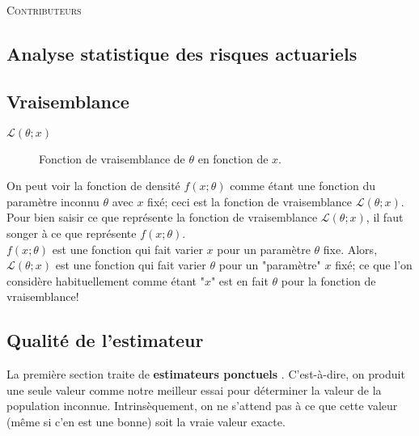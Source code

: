 \documentclass[10pt, french]{article}
\begin{document}
\begin{center}
	\textsc{\Large Contributeurs}\\[0.5cm] 
\end{center}


\newpage

\raggedcolumns
\begin{multicols*}{2}

\section*{Analyse statistique des risques actuariels}

\subsection*{Vraisemblance}

\begin{distributions}[Notation]
\begin{description}
	\item[$\mathcal{L}(\theta; x)$]	Fonction de vraisemblance de $\theta$ en fonction de $x$.
\end{description}
\end{distributions}

On peut voir la fonction de densité $f(x; \theta)$ comme étant une fonction du paramètre inconnu $\theta$ avec $x$ fixé; ceci est la fonction de vraisemblance $\mathcal{L}(\theta; x)$.
Pour bien saisir ce que représente la fonction de vraisemblance $\mathcal{L}(\theta; x)$, il faut songer à ce que représente $f(x; \theta)$. \\
$f(x; \theta)$ est une fonction qui fait varier $x$ pour un paramètre $\theta$ fixe. Alors, $\mathcal{L}(\theta; x)$ est une fonction qui fait varier $\theta$ pour un "paramètre" $x$ fixé; ce que l'on considère habituellement comme étant "$x$" est en fait $\theta$ pour la fonction de vraisemblance!

\subsection*{Qualité de l'estimateur}

La première section traite de \guillemotleft \textbf{estimateurs ponctuels} \guillemotright. 
C'est-à-dire, on produit une seule valeur comme notre meilleur essai pour déterminer la valeur de la population inconnue.
Intrinsèquement, on ne s'attend pas à ce que cette valeur (même si c'en est une bonne) soit la vraie valeur exacte.


\end{multicols*}
\end{document}
